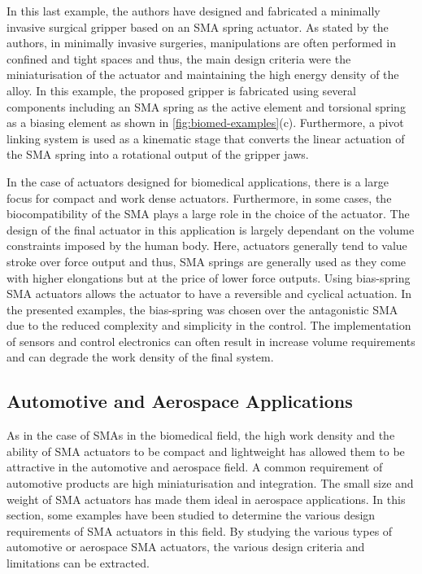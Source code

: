 In this last example, the authors have designed and fabricated a minimally invasive surgical gripper based on an SMA spring actuator. As stated by the authors, in minimally invasive surgeries, manipulations are often performed in confined and tight spaces and thus, the main design criteria were the miniaturisation of the actuator and maintaining the high energy density of the alloy. In this example, the proposed gripper is fabricated using several components including an SMA spring as the active element and torsional spring as a biasing element as shown in \cref{fig:biomed-examples}(c). Furthermore, a pivot linking system is used as a kinematic stage that converts the linear actuation of the SMA spring into a rotational output of the gripper jaws.

In the case of actuators designed for biomedical applications, there is a large focus for compact and work dense actuators. Furthermore, in some cases, the biocompatibility of the SMA plays a large role in the choice of the actuator. The design of the final actuator in this application is largely dependant on the volume constraints imposed by the human body. Here, actuators generally tend to value stroke over force output and thus, SMA springs are generally used as they come with higher elongations but at the price of lower force outputs. Using bias-spring SMA actuators allows the actuator to have a reversible and cyclical actuation. In the presented examples, the bias-spring was chosen over the antagonistic SMA due to the reduced complexity and simplicity in the control. The implementation of sensors and control electronics can often result in increase volume requirements and can degrade the work density of the final system.

\subsection{Automotive and Aerospace Applications}
As in the case of SMAs in the biomedical field, the high work density and the ability of SMA actuators to be compact and lightweight has allowed them to be attractive in the automotive and aerospace field. A common requirement of automotive products are high miniaturisation and integration. The small size and weight of SMA actuators has made them ideal in aerospace applications. In this section, some examples have been studied to determine the various design requirements of SMA actuators in this field. By studying the various types of automotive or aerospace SMA actuators, the various design criteria and limitations can be extracted.

